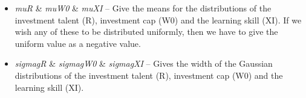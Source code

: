 \documentclass{article}
\begin{document}
\begin{itemize}

\item \emph{muR} \& \emph{muW0} \& \emph{muXI} -- Give the means for the distributions of the investment talent (R), investment cap (W0) and the learning skill (XI). If we wish any of these to be distributed uniformly, then we have to give the uniform value as a negative value. 

\item \emph{sigmagR} \& \emph{sigmagW0} \& \emph{sigmagXI} -- Gives the width of the Gaussian distributions of the investment talent (R), investment cap (W0) and the learning skill (XI).
\end{itemize}
\end{document}
